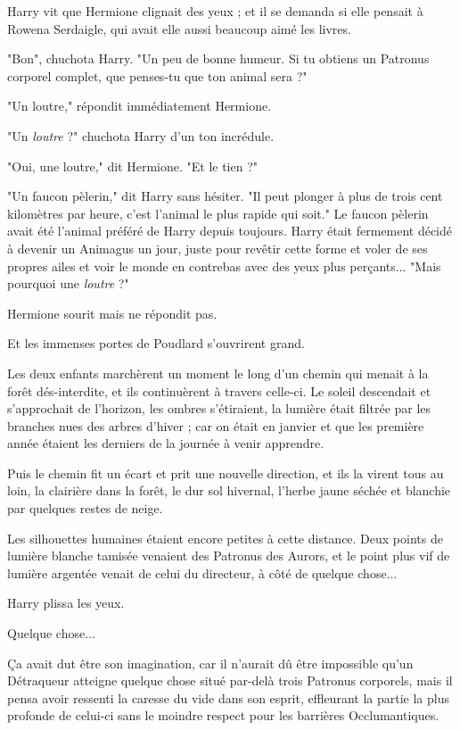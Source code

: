Harry vit que Hermione clignait des yeux ; et il se demanda si elle pensait à Rowena Serdaigle, qui avait elle aussi beaucoup aimé les livres.

"Bon", chuchota Harry. "Un peu de bonne humeur. Si tu obtiens un Patronus corporel complet, que penses-tu que ton animal sera ?"

"Un loutre," répondit immédiatement Hermione.

"Un \emph{loutre}  ?" chuchota Harry d'un ton incrédule.

"Oui, une loutre," dit Hermione. "Et le tien ?"

"Un faucon pèlerin," dit Harry sans hésiter. "Il peut plonger à plus de trois cent kilomètres par heure, c'est l'animal le plus rapide qui soit." Le faucon pèlerin avait été l'animal préféré de Harry depuis toujours. Harry était fermement décidé à devenir un Animagus un jour, juste pour revêtir cette forme et voler de ses propres ailes et voir le monde en contrebas avec des yeux plus perçants... "Mais pourquoi une \emph{loutre}  ?"

Hermione sourit mais ne répondit pas.

Et les immenses portes de Poudlard s'ouvrirent grand.

Les deux enfants marchèrent un moment le long d'un chemin qui menait à la forêt dés-interdite, et ils continuèrent à travers celle-ci. Le soleil descendait et s'approchait de l'horizon, les ombres s'étiraient, la lumière était filtrée par les branches nues des arbres d'hiver ; car on était en janvier et que les première année étaient les derniers de la journée à venir apprendre.

Puis le chemin fit un écart et prit une nouvelle direction, et ils la virent tous au loin, la clairière dans la forêt, le dur sol hivernal, l'herbe jaune séchée et blanchie par quelques restes de neige.

Les silhouettes humaines étaient encore petites à cette distance. Deux points de lumière blanche tamisée venaient des Patronus des Aurors, et le point plus vif de lumière argentée venait de celui du directeur, à côté de quelque chose...

Harry plissa les yeux.

Quelque chose...

Ça avait dut être son imagination, car il n'aurait dû être impossible qu'un Détraqueur atteigne quelque chose situé par-delà trois Patronus corporels, mais il pensa avoir ressenti la caresse du vide dans son esprit, effleurant la partie la plus profonde de celui-ci sans le moindre respect pour les barrières Occlumantiques.

